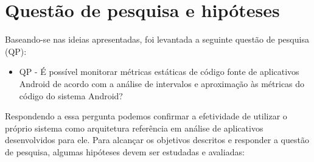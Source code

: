 

\section{Questão de pesquisa e hipóteses}

Baseando-se nas ideias apresentadas, foi levantada a seguinte questão de pesquisa (QP):

\begin{itemize}
\item QP - É possível monitorar métricas estáticas de código fonte de aplicativos Android de acordo com a análise de intervalos e aproximação às métricas do código do sistema Android?
\end{itemize}

Respondendo a essa pergunta podemos confirmar a efetividade de utilizar o próprio sistema como arquitetura referência em análise de aplicativos desenvolvidos para ele. Para alcançar os objetivos descritos e responder a questão de pesquisa, algumas hipóteses devem ser estudadas e avaliadas:

